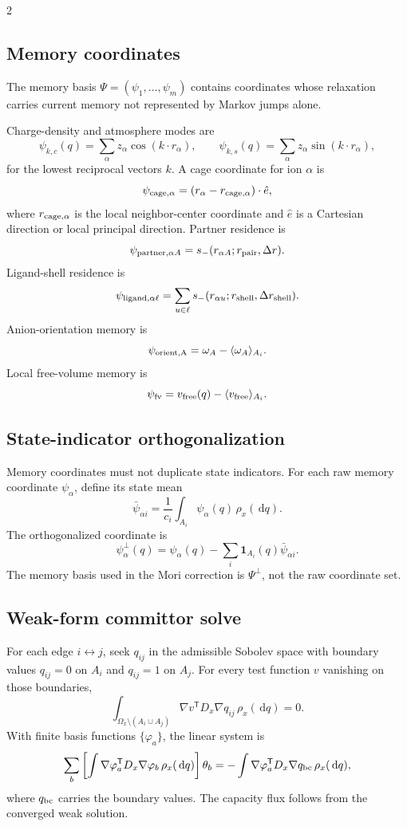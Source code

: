 \documentclass[10pt]{article}
\newcommand{\dd}{\,\mathrm d}
\newcommand{\T}{\mathsf{T}}
\begin{document}
\begin{multicols}{2}
\subsection{Memory coordinates}

The memory basis \(\Psi=(\psi_1,\ldots,\psi_m)\) contains coordinates whose
relaxation carries current memory not represented by Markov jumps alone.

Charge-density and atmosphere modes are
\[
\psi_{k,c}(q)=
\sum_\alpha z_\alpha\cos(k\cdot r_\alpha),
\qquad
\psi_{k,s}(q)=
\sum_\alpha z_\alpha\sin(k\cdot r_\alpha),
\]
for the lowest reciprocal vectors \(k\). A cage coordinate for ion \(\alpha\) is
\[
\psi_{\rm cage,\alpha}
=
(r_\alpha-r_{\rm cage,\alpha})\cdot\hat e,
\]
where \(r_{\rm cage,\alpha}\) is the local neighbor-center coordinate and
\(\hat e\) is a Cartesian direction or local principal direction. Partner
residence is
\[
\psi_{{\rm partner},\alpha A}
=
s_-(r_{\alpha A};r_{\rm pair},\Delta r).
\]
Ligand-shell residence is
\[
\psi_{{\rm ligand},\alpha\ell}
=
\sum_{u\in\ell}s_-(r_{\alpha u};r_{\rm shell},\Delta r_{\rm shell}).
\]
Anion-orientation memory is
\[
\psi_{\rm orient,A}
=
\omega_A-\langle\omega_A\rangle_{A_i}.
\]
Local free-volume memory is
\[
\psi_{\rm fv}
=
v_{\rm free}(q)-\langle v_{\rm free}\rangle_{A_i}.
\]

\subsection{State-indicator orthogonalization}

Memory coordinates must not duplicate state indicators. For each raw memory
coordinate \(\psi_\alpha\), define its state mean
\[
\bar\psi_{\alpha i}
=
\frac{1}{c_i}
\int_{A_i}\psi_\alpha(q)\,\rho_x(\dd q).
\]
The orthogonalized coordinate is
\[
\psi_\alpha^\perp(q)
=
\psi_\alpha(q)
-
\sum_i\mathbf 1_{A_i}(q)\bar\psi_{\alpha i}.
\]
The memory basis used in the Mori correction is \(\Psi^\perp\), not the raw
coordinate set.

\subsection{Weak-form committor solve}

For each edge \(i\leftrightarrow j\), seek \(q_{ij}\) in the admissible
Sobolev space with boundary values \(q_{ij}=0\) on \(A_i\) and \(q_{ij}=1\) on
\(A_j\). For every test function \(v\) vanishing on those boundaries,
\[
\int_{\Omega_x\setminus(A_i\cup A_j)}
\nabla v^\T D_x\nabla q_{ij}\,\rho_x(\dd q)
=0.
\]
With finite basis functions \(\{\varphi_a\}\), the linear system is
\[
\sum_b
\left[
\int\nabla\varphi_a^\T D_x\nabla\varphi_b\,\rho_x(\dd q)
\right]\theta_b
=
-
\int\nabla\varphi_a^\T D_x\nabla q_{\rm bc}\,\rho_x(\dd q),
\]
where \(q_{\rm bc}\) carries the boundary values. The capacity flux follows from
the converged weak solution.


\end{multicols}
\end{document}
